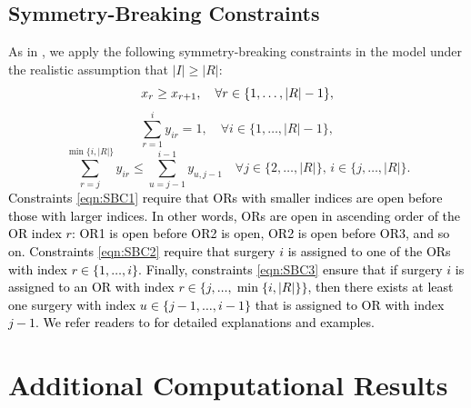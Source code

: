 \documentclass[preprint,review,11pt]{elsarticle}
\theoremstyle{definition}
\theoremstyle{remark}
\newcommand{\blue}{\textcolor{black}}
\begin{document}
\subsection{Symmetry-Breaking Constraints}  \label{appdx:DRORSP_SBC}

As in , we apply the following symmetry-breaking constraints  in the model under the realistic assumption that $|I|\geq |R|$:
%
\begin{equation} \label{eqn:SBC1}
    \blue{x_r \geq x_{r+1},\quad\forall r\in\{1,\dots, |R|-1\},}
\end{equation}
%
\begin{equation} \label{eqn:SBC2}
    \sum_{r=1}^i y_{ir} = 1,\quad\forall i\in\{1,\dots, |R|-1\},
\end{equation}
%
\begin{equation} \label{eqn:SBC3}
    \sum_{r=j}^{\min\{i,|R|\}} y_{ir} \leq \sum_{u=j-1}^{i-1} y_{u,j-1}\quad\forall j\in\{2,\dots,|R|\},\, i\in\{j,\dots,|R|\}.
\end{equation}
%
\blue{Constraints \eqref{eqn:SBC1} require that ORs with smaller indices are open before those with larger indices. In other words, ORs are open in ascending order of the OR index $r$: OR1 is open before OR2 is open, OR2 is open before OR3, and so on. Constraints \eqref{eqn:SBC2} require that surgery $i$ is assigned to one of the ORs with index $r\in\{1,\dots,i\}$. Finally, constraints \eqref{eqn:SBC3} ensure that if surgery $i$ is assigned to an OR with index $r\in\big\{j,\dots,\min\{i,|R|\}\big\}$, then there exists at least one surgery with index $u\in\{j-1,\dots,i-1\}$ that is assigned to OR with index $j-1$. We refer readers to  for detailed explanations and examples. }



\section{Additional Computational Results} \label{appdx:additional_results}
\end{document}
